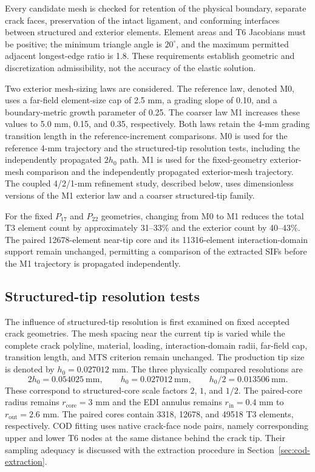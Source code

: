 \documentclass[11pt]{article}
\begin{document}
Every candidate mesh is checked for retention of the physical boundary,
separate crack faces, preservation of the intact ligament, and conforming
interfaces between structured and exterior elements. Element areas and
T6 Jacobians must be positive; the minimum triangle angle is
$20^\circ$, and the maximum permitted adjacent longest-edge ratio is 1.8.
These requirements establish geometric and discretization
admissibility, not the accuracy of the elastic solution.

Two exterior mesh-sizing laws are considered. The reference law,
denoted M0, uses a far-field element-size cap of 2.5 mm, a grading
slope of 0.10, and a boundary-metric growth parameter of 0.25.
The coarser law M1 increases these values to 5.0 mm, 0.15, and
0.35, respectively. Both laws retain the 4-mm grading transition
length in the reference-increment comparisons. M0 is used for
the reference 4-mm trajectory and the structured-tip resolution
tests, including the independently propagated $2h_0$ path.
M1 is used for the fixed-geometry exterior-mesh comparison
and the independently propagated exterior-mesh trajectory.
The coupled 4/2/1-mm refinement study, described below,
uses dimensionless versions of the M1 exterior law and a
coarser structured-tip family.

For the fixed $P_{17}$ and $P_{22}$ geometries, changing
from M0 to M1 reduces the total T3 element count by
approximately 31--33\% and the exterior count by 40--43\%.
The paired 12678-element near-tip core and its 11316-element
interaction-domain support remain unchanged, permitting a
comparison of the extracted SIFs before the M1 trajectory
is propagated independently.

\subsection{Structured-tip resolution tests}
The influence of structured-tip resolution is first examined on fixed
accepted crack geometries. The mesh spacing near the current tip is
varied while the complete crack polyline, material, loading,
interaction-domain radii, far-field cap, transition length, and MTS
criterion remain unchanged.
The production tip size is denoted by $h_0=0.027012$ mm. The three
physically compared resolutions are
\begin{equation}
 2h_0=0.054025\ \mathrm{mm},\qquad
 h_0=0.027012\ \mathrm{mm},\qquad
 h_0/2=0.013506\ \mathrm{mm}.
 \label{eq:tiplevels}
\end{equation}
These correspond to structured-core scale factors $2$, $1$, and $1/2$.
The paired-core radius remains $r_{\mathrm{core}}=3$ mm and the EDI annulus remains
$r_{\mathrm{in}}=0.4$ mm to $r_{\mathrm{out}}=2.6$ mm. The paired cores contain 3318, 12678, and
49518 T3 elements, respectively. COD fitting uses native crack-face
node pairs, namely corresponding upper and lower T6 nodes at the same
distance behind the crack tip. Their sampling adequacy is discussed
with the extraction procedure in Section~\ref{sec:cod-extraction}.
\end{document}
